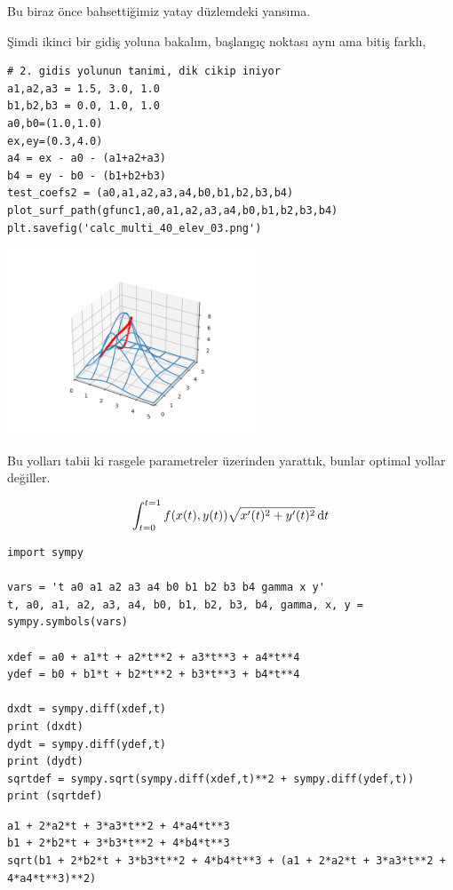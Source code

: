 \documentclass[12pt,fleqn]{article}\usepackage{../../common}
\begin{document}
Bu biraz önce bahsettiğimiz yatay düzlemdeki yansıma.

Şimdi ikinci bir gidiş yoluna bakalım, başlangıç noktası aynı ama bitiş farklı,

\begin{verbatim}
# 2. gidis yolunun tanimi, dik cikip iniyor
a1,a2,a3 = 1.5, 3.0, 1.0
b1,b2,b3 = 0.0, 1.0, 1.0
a0,b0=(1.0,1.0)
ex,ey=(0.3,4.0)
a4 = ex - a0 - (a1+a2+a3)
b4 = ey - b0 - (b1+b2+b3)
test_coefs2 = (a0,a1,a2,a3,a4,b0,b1,b2,b3,b4)
plot_surf_path(gfunc1,a0,a1,a2,a3,a4,b0,b1,b2,b3,b4)
plt.savefig('calc_multi_40_elev_03.png')
\end{verbatim}

\includegraphics[width=20em]{calc_multi_40_elev_03.png}

Bu yolları tabii ki rasgele parametreler üzerinden yarattık, bunlar optimal
yollar değiller.

$$
\int_{t=0}^{t=1} f(x(t),y(t)) \sqrt {x'(t)^2 + y'(t)^2} \,\mathrm{d} t
$$


\begin{verbatim}
import sympy

vars = 't a0 a1 a2 a3 a4 b0 b1 b2 b3 b4 gamma x y'
t, a0, a1, a2, a3, a4, b0, b1, b2, b3, b4, gamma, x, y = sympy.symbols(vars)

xdef = a0 + a1*t + a2*t**2 + a3*t**3 + a4*t**4
ydef = b0 + b1*t + b2*t**2 + b3*t**3 + b4*t**4

dxdt = sympy.diff(xdef,t)
print (dxdt)
dydt = sympy.diff(ydef,t)
print (dydt)
sqrtdef = sympy.sqrt(sympy.diff(xdef,t)**2 + sympy.diff(ydef,t))
print (sqrtdef)
\end{verbatim}

\begin{verbatim}
a1 + 2*a2*t + 3*a3*t**2 + 4*a4*t**3
b1 + 2*b2*t + 3*b3*t**2 + 4*b4*t**3
sqrt(b1 + 2*b2*t + 3*b3*t**2 + 4*b4*t**3 + (a1 + 2*a2*t + 3*a3*t**2 + 4*a4*t**3)**2)
\end{verbatim}
\end{document}
